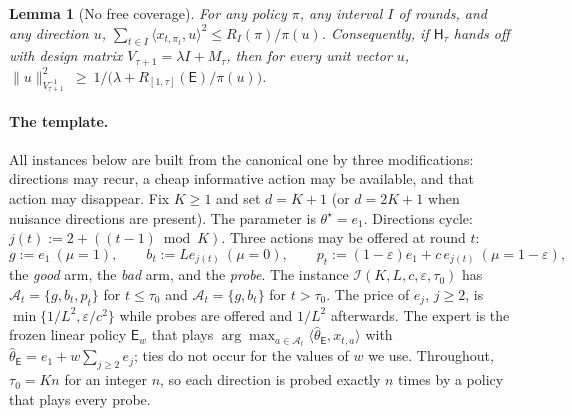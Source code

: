 \documentclass{article}
\newtheorem{lemma}{Lemma}
\theoremstyle{definition}
\theoremstyle{remark}
\newcommand{\eps}{\varepsilon}
\theoremstyle{remark}
\newcommand{\Exp}{\mathsf{E}}
\newcommand{\Hyb}{\mathsf{H}}
\begin{document}
\begin{lemma}[No free coverage]
\label{lem:no-free-coverage}
For any policy $\pi$, any interval $I$ of rounds, and any direction $u$,
$\sum_{t\in I}\langle x_{t,\pi_t},u\rangle^2\le R_I(\pi)/\pi(u)$.
Consequently, if $\Hyb_\tau$ hands off with design matrix $V_{\tau+1}=\lambda I+M_\tau$, then
for every unit vector $u$,
$\|u\|^2_{V_{\tau+1}^{-1}}\ \ge\ 1\big/\bigl(\lambda+R_{[1,\tau]}(\Exp)/\pi(u)\bigr)$.
\end{lemma}


\paragraph{The template.}
All instances below are built from the canonical one by three modifications:
directions may recur, a cheap informative action may be available, and that
action may disappear. Fix $K\ge1$ and set $d=K+1$ (or $d=2K+1$ when nuisance
directions are present). The parameter is $\theta^\star=e_1$. Directions
cycle: $j(t):=2+((t-1)\bmod K)$. Three actions may be offered at round $t$:
\[
g:=e_1\ (\mu=1),\qquad
b_t:=Le_{j(t)}\ (\mu=0),\qquad
p_t:=(1-\eps)e_1+c\,e_{j(t)}\ (\mu=1-\eps),
\]
the \emph{good} arm, the \emph{bad} arm, and the \emph{probe}. The instance
$\mathcal I(K,L,c,\eps,\tau_0)$ has $\mathcal A_t=\{g,b_t,p_t\}$ for $t\le\tau_0$
and $\mathcal A_t=\{g,b_t\}$ for $t>\tau_0$. The price of $e_j$, $j\ge2$, is
$\min\{1/L^2,\eps/c^2\}$ while probes are offered and $1/L^2$ afterwards. The
expert is the frozen linear policy $\Exp_w$ that plays
$\arg\max_{a\in\mathcal A_t}\langle\widehat\theta_{\Exp},x_{t,a}\rangle$ with
$\widehat\theta_{\Exp}=e_1+w\sum_{j\ge2}e_j$; ties do not occur for the values
of $w$ we use. Throughout, $\tau_0=Kn$ for an integer $n$, so each direction is
probed exactly $n$ times by a policy that plays every probe.
\end{document}
